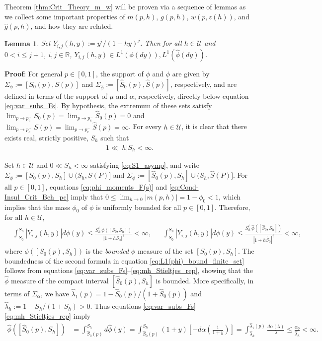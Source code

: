 \documentclass[english,12pt,jmp,graphicx]{revtex4-1}
\newtheorem{lemma}{Lemma}[section]
\newcommand{\ph}{\hat{\phi}}
\begin{document}
Theorem \ref{thm:Crit_Theory_m_w} will be proven via a sequence of
lemmas as we collect some important properties of $m(p,h)$, $g(p,h)$,
$w(p,z(h))$, and $\hat{g}(p,h)$, and how they are related.
%
\begin{lemma}\label{lem:L1_Yij}  
  Set $Y_{i,j}(h,y):=y^i/(1+hy)^j$. Then for all $h\in\mathcal{U}$ and
  $0<i\leq j+1$, $i,j\in\mathbb{R}$, $Y_{i,j}(h,y)\in
  L^1(\phi(dy)),L^1(\ph(dy))$. 
\end{lemma}
%
%
\noindent \textbf{Proof}:
%
For general $p\in[0,1]$, the support of $\phi$ and $\ph$ are given by
$\Sigma_\phi:=[S_0(p),S(p)]$ and $\Sigma_{\ph}:=[\hat{S}_0(p),\hat{S}(p)]$,
respectively, and are defined in terms of the support of $\mu$ and $\alpha$,
respectively, directly below equation \eqref{eq:var_subs_Fs}. By
hypothesis, the extremum of these sets satisfy
$\lim_{p\to p_c^+}S_0(p)=\lim_{p\to p_c^-}\hat{S}_0(p)=0$ and
$\lim_{p\to p_c^+}S(p)=\lim_{p\to p_c^-}\hat{S}(p)=\infty$. For every
$h\in\mathcal{U}$, it is clear that there exists real, strictly
positive, $S_h$ such that  
%
\begin{align}\label{eq:S1_asymp}
  1\ll|h|S_h<\infty.
\end{align}
%

Set $h\in\mathcal{U}$ and $0\ll S_h<\infty$ satisfying
\eqref{eq:S1_asymp}, and write $\Sigma_\phi:=[S_0(p),S_h]\cup(S_h,S(P)]$ and
$\Sigma_\phi:=[\hat{S}_0(p),S_h]\cup(S_h,\hat{S}(P)]$. For all $p\in[0,1]$, equations 
\eqref{eq:phi_moments_F(s)} and \eqref{eq:Cond-Insul_Crit_Beh_pc}
imply that $0\leq\lim_{h\to0}|m(p,h)|=1-\phi_0<1$, which implies that the mass
$\phi_0$ of $\phi$ is uniformly bounded for all $p\in[0,1]$. Therefore, for
all $h\in\mathcal{U}$, 
%
\begin{align}\label{eq:L1(phi)_bound_finite_set}
  &\int_{S_0}^{S_h}|Y_{i,j}(h,y)| d\phi(y)\leq
  \frac{S_h^i\,\phi([S_0,S_h])}{|1+hS_0|^j}<\infty,
 &&
  \int_{\hat{S}_0}^{S_h}|Y_{i,j}(h,y)| d\phi(y)\leq
  \frac{S_h^i\,\ph([\hat{S}_0,S_h])}{|1+h\hat{S}_0|^j}<\infty,
\end{align}
%
where $\phi([S_0(p),S_h])$ is the \emph{bounded} $\phi$ measure of the set
$[S_0(p),S_h]$. The boundedness of the second formula in equation
\eqref{eq:L1(phi)_bound_finite_set} follows from equations
\eqref{eq:var_subs_Fs}--\eqref{eq:mh_Stieltjes_rep}, 
showing that the $\ph$ measure of the compact interval
$[\hat{S}_0(p),S_h]$ is bounded. More specifically, in terms of
$\Sigma_\alpha$, we have $\hat{\lambda}_1(p)=1-\hat{S}_0(p)/(1+\hat{S}_0(p))$ and
$\hat{\lambda}_h:=1-S_h/(1+S_h)>0$. Thus equations
\eqref{eq:var_subs_Fs}--\eqref{eq:mh_Stieltjes_rep} imply  
%
\begin{align*}%
  \ph([\hat{S}_0(p),S_h])&=\int_{\hat{S}_0(p)}^{S_h}d\ph(y)
         =\int_{\hat{S}_0(p)}^{S_h}(1+y)\left[-d\alpha\left(\frac{1}{1+y}\right)\right]
         =\int_{\hat{\lambda}_h}^{\hat{\lambda}_1(p)}\frac{d\alpha(\lambda)}{\lambda}
         \leq\frac{\alpha_0}{\hat{\lambda}_h}<\infty.
\end{align*}
%
\end{document}
